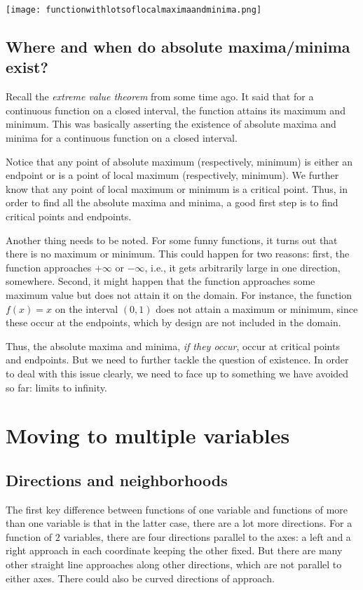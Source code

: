 \documentclass[10pt]{amsart}
\begin{document}
\texttt{[image: functionwithlotsoflocalmaximaandminima.png]}

\subsection{Where and when do absolute maxima/minima exist?}

Recall the {\em extreme value theorem} from some time ago. It said
that for a continuous function on a closed interval, the function
attains its maximum and minimum. This was basically asserting the
existence of absolute maxima and minima for a continuous function on a
closed interval.

Notice that any point of absolute maximum (respectively, minimum) is
either an endpoint or is a point of local maximum (respectively,
minimum). We further know that any point of local maximum or minimum
is a critical point. Thus, in order to find all the absolute maxima
and minima, a good first step is to find critical points and
endpoints.

Another thing needs to be noted. For some funny functions, it turns
out that there is no maximum or minimum. This could happen for two
reasons: first, the function approaches $+\infty$ or $-\infty$, i.e.,
it gets arbitrarily large in one direction, somewhere. Second, it
might happen that the function approaches some maximum value but does
not attain it on the domain. For instance, the function $f(x) = x$ on
the interval $(0,1)$ does not attain a maximum or minimum, since these
occur at the endpoints, which by design are not included in the
domain.

Thus, the absolute maxima and minima, {\em if they occur}, occur at
critical points and endpoints. But we need to further tackle the
question of existence. In order to deal with this issue clearly, we
need to face up to something we have avoided so far: limits to
infinity.

\section{Moving to multiple variables}

\subsection{Directions and neighborhoods}

The first key difference between functions of one variable and
functions of more than one variable is that in the latter case, there
are a lot more directions. For a function of $2$ variables, there are
four directions parallel to the axes: a left and a right approach in
each coordinate keeping the other fixed. But there are many other
straight line approaches along other directions, which are not
parallel to either axes. There could also be curved directions of
approach.
\end{document}
